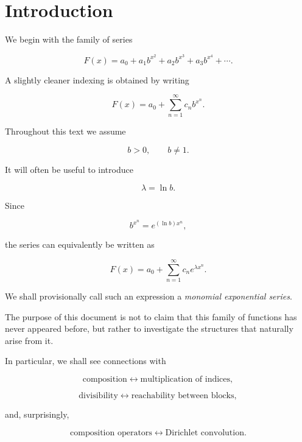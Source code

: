 
\chapter{Introduction}


We begin with the family of series

\[
F(x)
=
a_0
+
a_1b^{x^2}
+
a_2b^{x^3}
+
a_3b^{x^4}
+\cdots.
\]

A slightly cleaner indexing is obtained by writing

\[
F(x)
=
a_0+\sum_{n=1}^{\infty}c_n b^{x^n}.
\]

Throughout this text we assume

\[
b>0,
\qquad
b\neq1.
\]

It will often be useful to introduce

\[
\lambda=\ln b.
\]

Since

\[
b^{x^n}
=
e^{(\ln b)x^n},
\]

the series can equivalently be written as

\[
\boxed{
F(x)
=
a_0+\sum_{n=1}^{\infty}c_n e^{\lambda x^n}.
}
\]

We shall provisionally call such an expression a
\emph{monomial exponential series}.

The purpose of this document is not to claim that this family of
functions has never appeared before, but rather to investigate the
structures that naturally arise from it.

In particular, we shall see connections with

\[
\text{composition}
\longleftrightarrow
\text{multiplication of indices},
\]

\[
\text{divisibility}
\longleftrightarrow
\text{reachability between blocks},
\]

and, surprisingly,

\[
\text{composition operators}
\longleftrightarrow
\text{Dirichlet convolution}.
\]

